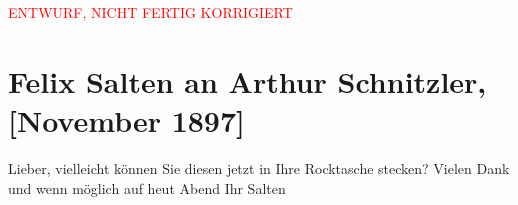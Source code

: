
\begin{center}
            \textcolor{red}{ENTWURF, NICHT FERTIG KORRIGIERT}
                      \end{center}
            
         \renewcommand{\erwaehnteOrte}{Orte: Wien}
         \renewcommand{\erwaehnteWerke}{}
               \section[Felix Salten an Arthur Schnitzler, {[}November 1897{]}]{ Felix Salten an Arthur Schnitzler, {[}November 1897{]}}\nopagebreak{}\rehead{ }\begin{ledgroupsized}[t]{13cm}\normalsize\beginnumbering \toendnotes[C]{\smallbreak\pagebreak[2]} 
\toendnotes[C]{\smallbreak}\pstart
           \noindent{}{\pb} Lieber, vielleicht können Sie diesen \label{K_L03275-1v}\label{K_L03275-1h} jetzt in Ihre Rocktasche stecken? \pend
           \pstart
           Vielen Dank und wenn möglich auf heut Abend \pend
           \pstart  Ihr \spacefill\mbox{Salten }\pend{}
         
         \endnumbering{}\end{ledgroupsized}\begin{anhang}\end{anhang}\newcommand{\dateiname}{L03275}\newcommand{\titel}{Felix Salten an Arthur Schnitzler, [November 1897]}\newcommand{\editorInnen}{Martin Anton Müller und Laura Untner}
      